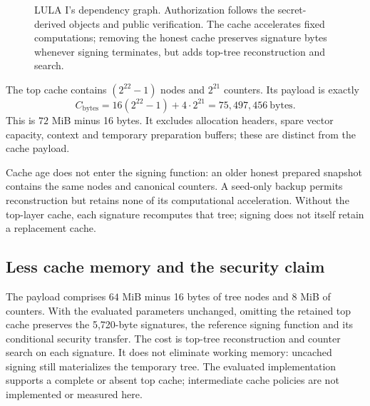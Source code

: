 \documentclass[a4paper,envcountsame,runningheads]{llncs}
\begin{document}
\begin{figure}[!htbp]
\centering
{}
\caption{LULA I's dependency graph. Authorization follows the secret-derived objects and public verification. The cache accelerates fixed computations; removing the honest cache preserves signature bytes whenever signing terminates, but adds top-tree reconstruction and search.}\label{fig:dependency}
\end{figure}

The top cache contains $(2^{22}-1)$ nodes and $2^{21}$ counters. Its payload is exactly
\begin{equation}\label{eq:cache}
 C_{\mathrm{bytes}}=16(2^{22}-1)+4\cdot2^{21}
 =75{,}497{,}456\ \mathrm{bytes}.
\end{equation}
This is $72$ MiB minus 16 bytes. It excludes allocation headers, spare vector capacity, context and temporary preparation buffers; these are distinct from the cache payload.

Cache age does not enter the signing function: an older honest prepared snapshot contains the same nodes and canonical counters. A seed-only backup permits reconstruction but retains none of its computational acceleration. Without the top-layer cache, each signature recomputes that tree; signing does not itself retain a replacement cache.

\subsection{Less cache memory and the security claim}\label{sec:memorytradeoff}
The payload comprises $64$ MiB minus 16 bytes of tree nodes and $8$ MiB of counters. With the evaluated parameters unchanged, omitting the retained top cache preserves the 5,720-byte signatures, the reference signing function and its conditional security transfer. The cost is top-tree reconstruction and counter search on each signature. It does not eliminate working memory: uncached signing still materializes the temporary tree. The evaluated implementation supports a complete or absent top cache; intermediate cache policies are not implemented or measured here.
\end{document}
